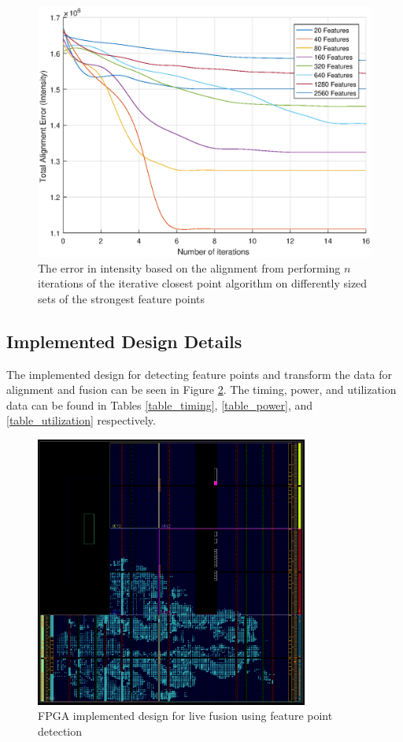 \documentclass{article}
\begin{document}
\begin{figure}[h]
	\centering
	\includegraphics[width=\textwidth]{figures/alignment/error_for_alignment}
	\caption{The error in intensity based on the alignment from performing $n$ iterations of the iterative closest point algorithm on differently sized sets of the strongest feature points}
	\label{fig_results_alignment_error_plot}
\end{figure}

\subsection{Implemented Design Details}

The implemented design for detecting feature points and transform the data for alignment and fusion can be seen in Figure \ref{fig_implemented}. The timing, power, and utilization data can be found in Tables \ref{table_timing}, \ref{table_power}, and \ref{table_utilization} respectively.

\begin{figure}[h]
	\centering
	\includegraphics[width=0.8\textwidth]{figures/pictures/implemented}
	\caption{FPGA implemented design for live fusion using feature point detection}
	\label{fig_implemented}
\end{figure}
\end{document}
